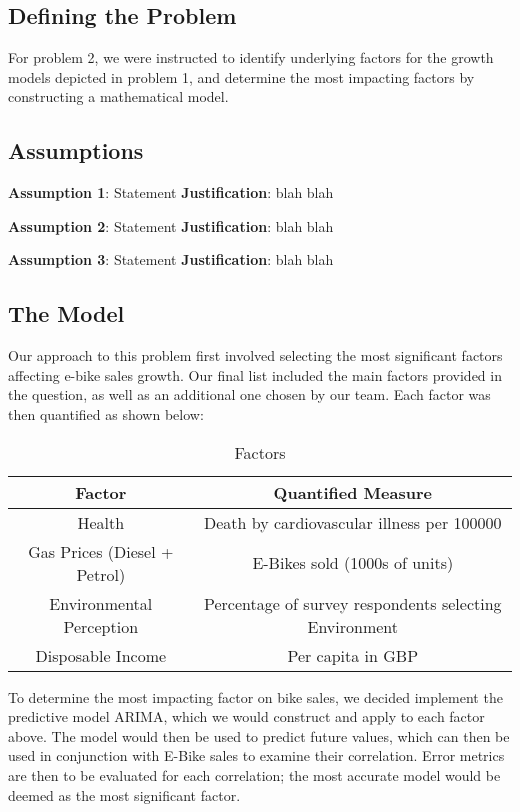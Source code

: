 \subsection{Defining the Problem}
For problem 2, we were instructed to identify underlying factors for the growth models depicted in problem 1, and determine the most impacting factors by constructing a mathematical model.

\subsection{Assumptions}
\noindent\textbf{Assumption 1}: Statement
\textbf{Justification}: blah blah

\noindent\textbf{Assumption 2}: Statement
\textbf{Justification}: blah blah

\noindent\textbf{Assumption 3}: Statement
\textbf{Justification}: blah blah


\subsection{The Model}
Our approach to this problem first involved selecting the most significant factors affecting e-bike sales growth. Our final list included the main factors provided in the question, as well as an additional one chosen by our team. Each factor was then quantified as shown below: 


\begin{table}[h!]
    \centering
    \begin{tabular}{cc}
        \toprule
        Factor & Quantified Measure      \\
        \midrule
        Health   & Death by cardiovascular illness per 100000     \\
        Gas Prices (Diesel + Petrol) & E-Bikes sold (1000s of units)     \\
        Environmental Perception & Percentage of survey respondents selecting Environment\\
        Disposable Income & Per capita in GBP\\
        \bottomrule
    \end{tabular}
    \caption{Factors}
    \label{tab:my_label}
\end{table}


To determine the most impacting factor on bike sales, we decided implement the predictive model ARIMA, which we would construct and apply to each factor above.
The model would then be used to predict future values, which can then be used in conjunction with E-Bike sales to examine their correlation. Error metrics are then
to be evaluated for each correlation; the most accurate model would be deemed as the most significant factor.

